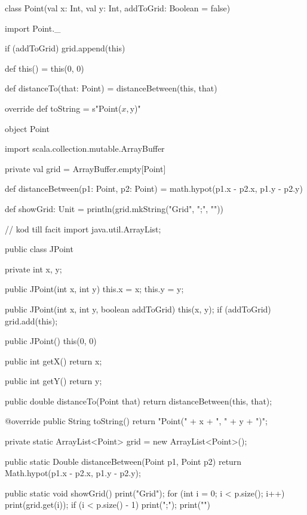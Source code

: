 \begin{Code}[numbers=left]
class Point(val x: Int, val y: Int, addToGrid: Boolean = false) {
  import Point._
  
  if (addToGrid) grid.append(this)
  
  def this() = this(0, 0)
  
  def distanceTo(that: Point) = distanceBetween(this, that)
  
  override def toString = s"Point($x, $y)"
}

object Point {
  import scala.collection.mutable.ArrayBuffer
  
  private val grid = ArrayBuffer.empty[Point]
  
  def distanceBetween(p1: Point, p2: Point) = 
    math.hypot(p1.x - p2.x, p1.y - p2.y)    
  
  def showGrid: Unit = println(grid.mkString("Grid{", ";", "}"))
}
\end{Code}


\begin{Code}[language=Java, numbers=left]
// kod till facit
import java.util.ArrayList;

public class JPoint {
    private int x, y;
  
    public JPoint(int x, int y){
      this.x = x;
      this.y = y;
    }

    public JPoint(int x, int y, boolean addToGrid){
        this(x, y);
        if (addToGrid) {
            grid.add(this);
        }
    }
  
    public JPoint(){
        this(0, 0)
    }
  
    public int getX(){
        return x;
    }
  
    public int getY(){
        return y;
    }
    
    public double distanceTo(Point that) {
      return distanceBetween(this, that);
    }
    
    @override
    public String toString() {
        return "Point(" + x + ", " + y + ")";
    }

    private static ArrayList<Point> grid = new ArrayList<Point>();

    public static Double distanceBetween(Point p1, Point p2) {
        return Math.hypot(p1.x - p2.x, p1.y - p2.y);
    }
    
    public static void showGrid() {
        print("Grid{");
        for (int i = 0; i < p.size(); i++){
          print(grid.get(i));
          if (i < p.size() - 1) {
            print(";");
          }
        } 
        print("}")
    }
}
\end{Code}


